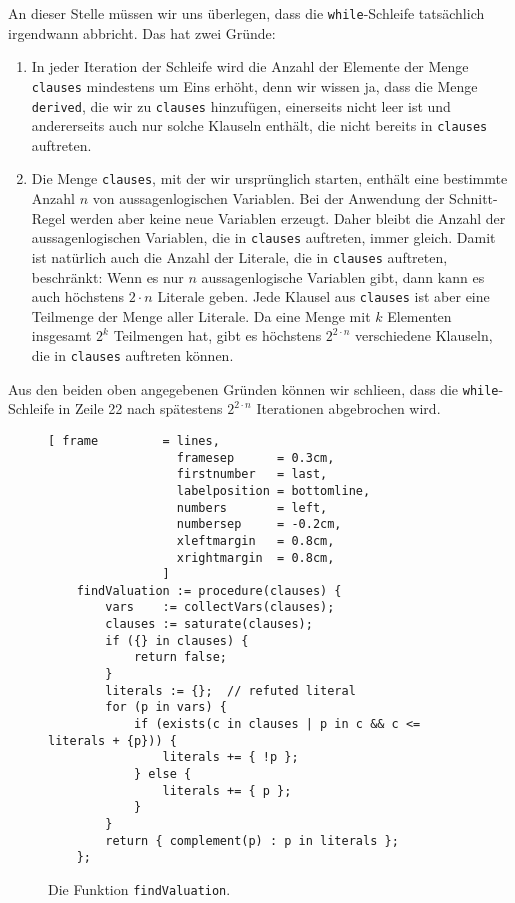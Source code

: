 An dieser Stelle m\"{u}ssen wir uns \"{u}berlegen, dass die \texttt{while}-Schleife tats\"{a}chlich irgendwann
abbricht.  Das hat zwei Gr\"{u}nde:  
\begin{enumerate}
\item In jeder Iteration der Schleife wird die Anzahl der Elemente der Menge \texttt{clauses}
      mindestens um Eins erh\"{o}ht, denn wir wissen ja, dass die Menge \texttt{derived}, die wir zu
      \texttt{clauses} hinzuf\"{u}gen, einerseits nicht leer ist und andererseits auch nur solche
      Klauseln enth\"{a}lt, die nicht bereits in \texttt{clauses} auftreten.
\item Die Menge \texttt{clauses}, mit der wir urspr\"{u}nglich starten, enth\"{a}lt eine bestimmte Anzahl $n$
      von aussagenlogischen Variablen.  Bei der Anwendung der Schnitt-Regel werden aber keine neue
      Variablen erzeugt.  Daher bleibt die Anzahl der aussagenlogischen Variablen, die in
      \texttt{clauses} auftreten, immer gleich.  Damit ist nat\"{u}rlich auch die Anzahl der Literale,
      die in \texttt{clauses} auftreten, beschr\"{a}nkt: Wenn es nur $n$ aussagenlogische Variablen gibt,
      dann kann es auch h\"{o}chstens $2 \cdot n$ Literale geben.  Jede Klausel aus \texttt{clauses} ist
      aber eine Teilmenge der Menge aller Literale.  Da eine Menge mit $k$ Elementen insgesamt $2^k$
      Teilmengen hat, gibt es h\"{o}chstens $2^{2 \cdot n}$ verschiedene Klauseln, die in
      \texttt{clauses} auftreten k\"{o}nnen.  
\end{enumerate}
Aus den beiden oben angegebenen Gr\"{u}nden k\"{o}nnen wir schlie\3en, dass die \texttt{while}-Schleife in
Zeile 22 nach sp\"{a}testens $2^{2 \cdot n}$ Iterationen abgebrochen wird. 

\begin{figure}[!ht]
\centering
\begin{Verbatim}[ frame         = lines, 
                  framesep      = 0.3cm, 
                  firstnumber   = last,
                  labelposition = bottomline,
                  numbers       = left,
                  numbersep     = -0.2cm,
                  xleftmargin   = 0.8cm,
                  xrightmargin  = 0.8cm,
                ]
    findValuation := procedure(clauses) {
        vars    := collectVars(clauses);
        clauses := saturate(clauses);
        if ({} in clauses) {
            return false;
        }
        literals := {};  // refuted literal
        for (p in vars) {
            if (exists(c in clauses | p in c && c <= literals + {p})) {
                literals += { !p };
            } else {
                literals += { p };
            }
        }
        return { complement(p) : p in literals };
    };
\end{Verbatim}
\vspace*{-0.3cm}
\caption{Die Funktion \texttt{findValuation}.}
\label{fig:completeness.stlx-3}
\end{figure}

